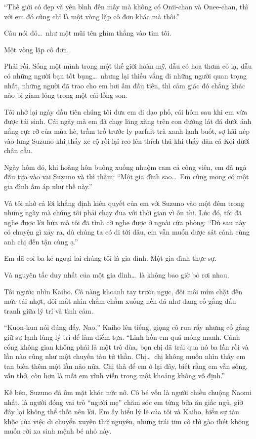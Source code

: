 \documentclass[../main.tex]{subfiles}
\begin{document}
``Thế giới có đẹp và yên bình đến mấy mà không có Onii-chan và Onee-chan, thì với em đó cũng chỉ là một vòng lặp cô đơn khác mà thôi.''

Câu nói đó\dots\ như một mũi tên ghim thẳng vào tim tôi.

Một vòng lặp cô đơn.

Phải rồi. Sống một mình trong một thế giới hoàn mỹ, dẫu có hoa thơm cỏ lạ, dẫu có những người bạn tốt bụng\dots\ nhưng lại thiếu vắng đi những người quan trọng nhất, những người đã trao cho em hơi ấm đầu tiên, thì cảm giác đó chẳng khác nào bị giam lỏng trong một cái lồng son.

Tôi nhớ lại ngày đầu tiên chúng tôi đưa em đi dạo phố, cái hôm sau khi em vừa được tái sinh. Cái ngày mà em đã chạy lăng xăng trên con đường lát đá dưới ánh nắng rực rỡ của mùa hè, trầm trồ trước ly parfait trà xanh lạnh buốt, sợ hãi nép vào lưng Suzuno khi thấy xe cộ rồi lại reo lên thích thú khi thấy đàn cá Koi dưới chân cầu.

Ngày hôm đó, khi hoàng hôn buông xuống nhuộm cam cả công viên, em đã ngả đầu tựa vào vai Suzuno và thì thầm: ``Một gia đình sao\dots\ Em cũng mong có một gia đình ấm áp như thế này.''

Và tôi nhớ cả lời khẳng định kiên quyết của em với Suzuno vào một đêm trong những ngày mà chúng tôi phải chạy đua với thời gian vì ôn thi. Lúc đó, tôi đã nghe được lời hứa mà tôi đã tình cờ nghe được ở ngoài cửa phòng: ``Dù sau này có chuyện gì xảy ra, dù chúng ta có đi tới đâu, em vẫn muốn được sát cánh cùng anh chị đến tận cùng ạ.''

Em đã coi ba kẻ ngoại lai chúng tôi là gia đình. Một gia đình thực sự.

Và nguyên tắc duy nhất của một gia đình\dots\ là không bao giờ bỏ rơi nhau.

Tôi ngước nhìn Kaiho. Cô nàng khoanh tay trước ngực, đôi môi mím chặt đến mức tái nhợt, đôi mắt nhìn chằm chằm xuống nền đá như đang cố gắng đấu tranh giữa lý trí và tình cảm.

``Kuon-kun nói đúng đấy, Nao,'' Kaiho lên tiếng, giọng cô run rẩy nhưng cố gắng giữ sự lạnh lùng lý trí để làm điểm tựa. ``Linh hồn em quá mỏng manh. Cánh cổng không gian không phải là một trò đùa, bọn chị đã trải qua nó ba lần rồi và lần nào cũng như một chuyến tàu tử thần. Chị\dots\ chị không muốn nhìn thấy em tan biến thêm một lần nào nữa. Chị thà để em ở lại đây, biết rằng em vẫn sống, vẫn thở, còn hơn là mất em vĩnh viễn trong một khoảng không vô định.''

Kế bên, Suzuno đã ôm mặt khóc nức nở. Cô bé vốn là người chiều chuộng Naomi nhất, là người đóng vai trò ``người mẹ'' chăm sóc em từng bữa ăn giấc ngủ, giờ đây lại không thể thốt nên lời. Em ấy hiểu lý lẽ của tôi và Kaiho, hiểu sự tàn khốc của việc di chuyển xuyên thứ nguyên, nhưng trái tim cô thì gào thét không muốn rời xa sinh mệnh bé nhỏ này.
\end{document}
